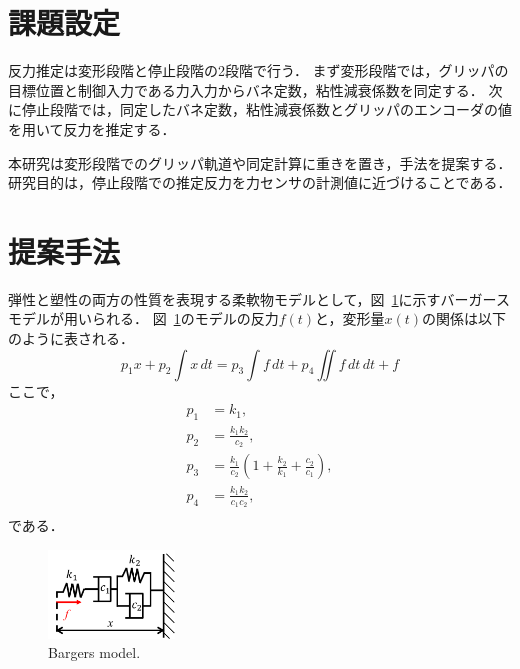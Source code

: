 \documentclass[a4paper]{jarticle}
\begin{document}
\section{課題設定}
反力推定は変形段階と停止段階の2段階で行う．
まず変形段階では，グリッパの目標位置と制御入力である力入力からバネ定数，粘性減衰係数を同定する．
次に停止段階では，同定したバネ定数，粘性減衰係数とグリッパのエンコーダの値を用いて反力を推定する．

本研究は変形段階でのグリッパ軌道や同定計算に重きを置き，手法を提案する．
研究目的は，停止段階での推定反力を力センサの計測値に近づけることである．
\section{提案手法}
弾性と塑性の両方の性質を表現する柔軟物モデルとして，図~\ref{fig:BS_model}に示すバーガースモデルが用いられる\cite{ref_MSD}．
図~\ref{fig:BS_model}のモデルの反力$f(t)$と，変形量$x(t)$の関係は以下のように表される．
\begin{equation}
    p_1 {x} + p_2 \int{x}\,dt = p_3\int{f}\,dt +p_4\iint{f}\,dt\,dt  + f
    \label{eq:BSmodel}
\end{equation}
ここで，
\begin{equation}
    \begin{aligned}
        p_1 &= k_1,  \\
        p_2 &= \frac{k_1 k_2}{c_2},    \\
        p_3 &= \frac{k_1}{c_2}\left(1+\frac{k_2}{k_1}+\frac{c_2}{c_1}\right),\\
        p_4 &= \frac{k_1k_2}{c_1 c_2} ,\\
    \end{aligned}
    \label{eq:p2ck}
\end{equation}
である．
\begin{figure}[tb]
    \centering
    \includegraphics[width=0.3\textwidth]{BS_model.pdf}
    \caption{Bargers model.}
    \label{fig:BS_model}
\end{figure}
\end{document}
